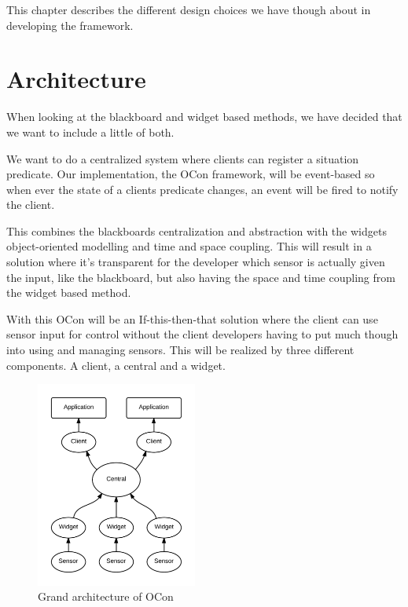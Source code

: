 \documentclass[../report.tex]{subfiles}
\begin{document}
\graphicspath{{img/}{../img/}}
This chapter describes the different design choices we have though about in developing the framework.

%
%

\section{Architecture}
When looking at the blackboard and widget based methods, we have decided that we want to include a little of both.

We want to do a centralized system where clients can register a situation predicate. Our implementation, the OCon framework, will be event-based so when ever the state of a clients predicate changes, an event will be fired to notify the client. 

This combines the blackboards centralization and abstraction with the widgets object-oriented modelling and time and space coupling. This will result in a solution where it's transparent for the developer which sensor is actually given the input, like the blackboard, but also having the space and time coupling from the widget based method.

With this OCon will be an If-this-then-that solution where the client can use sensor input for control without the client developers having to put much though into using and managing sensors. This will be realized by three different components. A client, a central and a widget. 

\begin{figure}
\centering
\includegraphics[width=200px]{grandarchitecture.png}
\caption{Grand architecture of OCon}
\label{fig:composite}
\end{figure}
\end{document}
